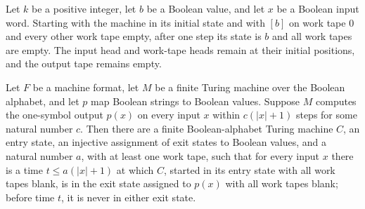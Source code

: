 \begin{lemma}
\label{Turing.MachineFormat.canonBoolPop_run}
\leanok
{}
Let $k$ be a positive integer, let $b$ be a Boolean value, and let $x$ be a Boolean
input word. Starting with the machine in its initial state and with $[b]$ on work tape
$0$ and every other work tape empty, after one step its state is $b$ and all work tapes
are empty. The input head and work-tape heads remain at their initial positions, and the
output tape remains empty.
\end{lemma}

\begin{lemma}
\label{Turing.MachineFormat.exists_canonBoolBranch}
\leanok
{}
Let $F$ be a machine format, let $M$ be a finite Turing machine over the Boolean
alphabet, and let $p$ map Boolean strings to Boolean values. Suppose $M$ computes the
one-symbol output $p(x)$ on every input $x$ within $c(|x|+1)$ steps for some natural
number $c$. Then there are a finite Boolean-alphabet Turing machine $C$, an entry state,
an injective assignment of exit states to Boolean values, and a natural number $a$, with
at least one work tape, such that for every input $x$ there is a time $t\le a(|x|+1)$ at
which $C$, started in its entry state with all work tapes blank, is in the exit state
assigned to $p(x)$ with all work tapes blank; before time $t$, it is never in either
exit state.
\end{lemma}

